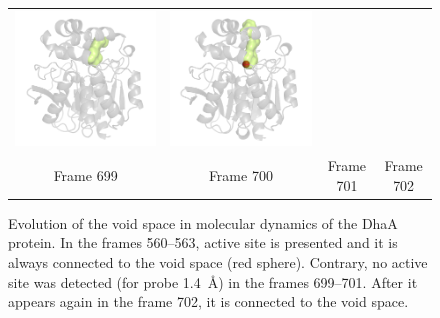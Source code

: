 \documentclass[usletter, 10pt, conference]{svjour3}      %
\begin{document}
\begin{figure}
{\begin{tabular}{cccc}
\includegraphics[width=\ee\textwidth]{fig/video-0701} &
\includegraphics[width=\ee\textwidth]{fig/video-0702}  \\
Frame 699 & Frame 700 & Frame 701 & Frame 702   \\                       
\end{tabular}
}
\caption{\label{fig::dyn}
Evolution of the void space in molecular dynamics of the DhaA protein. 
In the frames 560--563, active site is presented and it is always connected to the void space (red sphere).
Contrary, no active site was detected (for probe 1.4~\AA) in the frames 699--701.
After it appears again in the frame 702, it is connected to the void space.
}
\end{figure}
\end{document}
